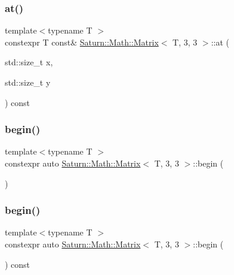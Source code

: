 \subsubsection{\texorpdfstring{at()}{at()}\hspace{0.1cm}{\footnotesize\ttfamily [2/2]}}
{\footnotesize\ttfamily template$<$typename T $>$ \\
constexpr T const\& \mbox{\hyperlink{class_saturn_1_1_math_1_1_matrix}{Saturn\+::\+Math\+::\+Matrix}}$<$ T, 3, 3 $>$\+::at (\begin{DoxyParamCaption}\item[{std\+::size\+\_\+t}]{x,  }\item[{std\+::size\+\_\+t}]{y }\end{DoxyParamCaption}) const\hspace{0.3cm}{\ttfamily [inline]}}

\mbox{\label{class_saturn_1_1_math_1_1_matrix_3_01_t_00_013_00_013_01_4_a684ea34f60638b1ec34d4dd3a37dc221}} 
\subsubsection{\texorpdfstring{begin()}{begin()}\hspace{0.1cm}{\footnotesize\ttfamily [1/2]}}
{\footnotesize\ttfamily template$<$typename T $>$ \\
constexpr auto \mbox{\hyperlink{class_saturn_1_1_math_1_1_matrix}{Saturn\+::\+Math\+::\+Matrix}}$<$ T, 3, 3 $>$\+::begin (\begin{DoxyParamCaption}{ }\end{DoxyParamCaption})\hspace{0.3cm}{\ttfamily [inline]}}

\mbox{\label{class_saturn_1_1_math_1_1_matrix_3_01_t_00_013_00_013_01_4_a313986a6c516f12bfdac32fd321d5475}} 
\subsubsection{\texorpdfstring{begin()}{begin()}\hspace{0.1cm}{\footnotesize\ttfamily [2/2]}}
{\footnotesize\ttfamily template$<$typename T $>$ \\
constexpr auto \mbox{\hyperlink{class_saturn_1_1_math_1_1_matrix}{Saturn\+::\+Math\+::\+Matrix}}$<$ T, 3, 3 $>$\+::begin (\begin{DoxyParamCaption}{ }\end{DoxyParamCaption}) const\hspace{0.3cm}{\ttfamily [inline]}}

